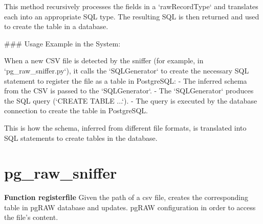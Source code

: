 \documentclass[sigconf,natbib=false]{acmart}
\begin{document}
\begin{draft}
This method recursively processes the fields in a `rawRecordType` and translates each into an appropriate SQL type. The resulting SQL is then returned and used to create the table in a database.

### Usage Example in the System:

When a new CSV file is detected by the sniffer (for example, in `pg_raw_sniffer.py`), it calls the `SQLGenerator` to create the necessary SQL statement to register the file as a table in PostgreSQL:
- The inferred schema from the CSV is passed to the `SQLGenerator`.
- The `SQLGenerator` produces the SQL query (`CREATE TABLE ...`).
- The query is executed by the database connection to create the table in PostgreSQL.

This is how the schema, inferred from different file formats, is translated into SQL statements to create tables in the database.

\section{pg_raw_sniffer}
\textbf{Function registerfile}
Given the path of a csv file, creates the corresponding table in pgRAW database and updates.
pgRAW configuration in order to access the file's content.
\end{draft}
\end{document}
